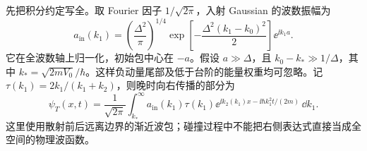 \begin{checkedsolution}
先把积分约定写全。取 Fourier 因子 $1/\sqrt{2\pi}$，入射 Gaussian 的波数振幅为
\begin{equation}
  a_{\mathrm{in}}(k_1)
  =\left(\frac{\Delta^2}{\pi}\right)^{1/4}
    \exp\left[-\frac{\Delta^2(k_1-k_0)^2}{2}\right]
    \ee^{\ii k_1a}.
  \label{eq:QM-C05-S04-E01-incident-weight}
\end{equation}
它在全波数轴上归一化，初始包中心在 $-a$。假设 $a\gg\Delta$，且
$k_0-k_*\gg1/\Delta$，其中 $k_*=\sqrt{2mV_0}/\hbar$。这样负动量尾部及低于台阶的能量权重均可忽略。记
$\tau(k_1)=2k_1/(k_1+k_2)$，则晚时向右传播的部分为
\begin{equation}
  \psi_T(x,t)=\frac1{\sqrt{2\pi}}
  \int_{k_*}^{\infty}a_{\mathrm{in}}(k_1)\tau(k_1)
  \ee^{\ii k_2(k_1)x-\ii\hbar k_1^2t/(2m)}\,\dd k_1.
  \label{eq:QM-C05-S04-E01-packet-integral}
\end{equation}
这里使用散射前后远离边界的渐近波包；碰撞过程中不能把右侧表达式直接当成全空间的物理波函数。


\end{checkedsolution}
